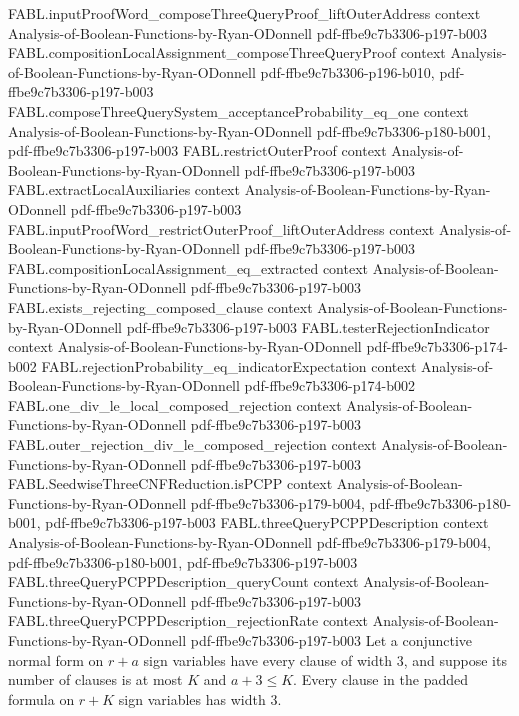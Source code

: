\begin{theorem}
\proofstep
  {FABL.inputProofWord_composeThreeQueryProof_liftOuterAddress}
  {context}
  {Analysis-of-Boolean-Functions-by-Ryan-ODonnell}
  {pdf-ffbe9c7b3306-p197-b003}
\proofstep
  {FABL.compositionLocalAssignment_composeThreeQueryProof}
  {context}
  {Analysis-of-Boolean-Functions-by-Ryan-ODonnell}
  {pdf-ffbe9c7b3306-p196-b010,
    pdf-ffbe9c7b3306-p197-b003}
\proofstep
  {FABL.composeThreeQuerySystem_acceptanceProbability_eq_one}
  {context}
  {Analysis-of-Boolean-Functions-by-Ryan-ODonnell}
  {pdf-ffbe9c7b3306-p180-b001,
    pdf-ffbe9c7b3306-p197-b003}
\proofstep
  {FABL.restrictOuterProof}
  {context}
  {Analysis-of-Boolean-Functions-by-Ryan-ODonnell}
  {pdf-ffbe9c7b3306-p197-b003}
\proofstep
  {FABL.extractLocalAuxiliaries}
  {context}
  {Analysis-of-Boolean-Functions-by-Ryan-ODonnell}
  {pdf-ffbe9c7b3306-p197-b003}
\proofstep
  {FABL.inputProofWord_restrictOuterProof_liftOuterAddress}
  {context}
  {Analysis-of-Boolean-Functions-by-Ryan-ODonnell}
  {pdf-ffbe9c7b3306-p197-b003}
\proofstep
  {FABL.compositionLocalAssignment_eq_extracted}
  {context}
  {Analysis-of-Boolean-Functions-by-Ryan-ODonnell}
  {pdf-ffbe9c7b3306-p197-b003}
\proofstep
  {FABL.exists_rejecting_composed_clause}
  {context}
  {Analysis-of-Boolean-Functions-by-Ryan-ODonnell}
  {pdf-ffbe9c7b3306-p197-b003}
\proofstep
  {FABL.testerRejectionIndicator}
  {context}
  {Analysis-of-Boolean-Functions-by-Ryan-ODonnell}
  {pdf-ffbe9c7b3306-p174-b002}
\proofstep
  {FABL.rejectionProbability_eq_indicatorExpectation}
  {context}
  {Analysis-of-Boolean-Functions-by-Ryan-ODonnell}
  {pdf-ffbe9c7b3306-p174-b002}
\proofstep
  {FABL.one_div_le_local_composed_rejection}
  {context}
  {Analysis-of-Boolean-Functions-by-Ryan-ODonnell}
  {pdf-ffbe9c7b3306-p197-b003}
\proofstep
  {FABL.outer_rejection_div_le_composed_rejection}
  {context}
  {Analysis-of-Boolean-Functions-by-Ryan-ODonnell}
  {pdf-ffbe9c7b3306-p197-b003}
\proofstep
  {FABL.SeedwiseThreeCNFReduction.isPCPP}
  {context}
  {Analysis-of-Boolean-Functions-by-Ryan-ODonnell}
  {pdf-ffbe9c7b3306-p179-b004,
    pdf-ffbe9c7b3306-p180-b001,
    pdf-ffbe9c7b3306-p197-b003}
\proofstep
  {FABL.threeQueryPCPPDescription}
  {context}
  {Analysis-of-Boolean-Functions-by-Ryan-ODonnell}
  {pdf-ffbe9c7b3306-p179-b004,
    pdf-ffbe9c7b3306-p180-b001,
    pdf-ffbe9c7b3306-p197-b003}
\proofstep
  {FABL.threeQueryPCPPDescription_queryCount}
  {context}
  {Analysis-of-Boolean-Functions-by-Ryan-ODonnell}
  {pdf-ffbe9c7b3306-p197-b003}
\proofstep
  {FABL.threeQueryPCPPDescription_rejectionRate}
  {context}
  {Analysis-of-Boolean-Functions-by-Ryan-ODonnell}
  {pdf-ffbe9c7b3306-p197-b003}
Let a conjunctive normal form on $r+a$ sign variables have every clause of width $3$,
and suppose its number of clauses is at most $K$ and $a+3\le K$. Every clause in the
padded formula on $r+K$ sign variables has width $3$.
\end{theorem}

